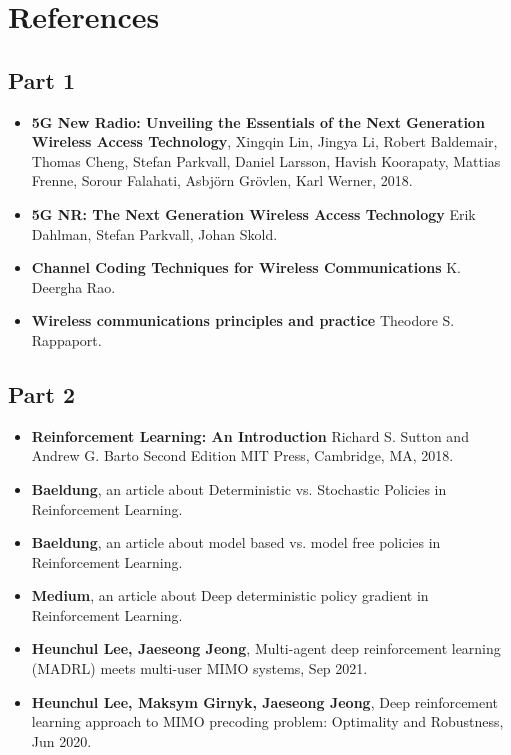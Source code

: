 \chapter{References}

\section{Part 1}
    \begin{itemize}
        \item \textbf{5G New Radio: Unveiling the Essentials of the Next Generation Wireless Access Technology}, Xingqin Lin, Jingya Li, Robert Baldemair, Thomas Cheng, Stefan Parkvall, Daniel Larsson, Havish Koorapaty, Mattias Frenne, Sorour Falahati, Asbjörn Grövlen, Karl Werner, 2018.
        \item \textbf{5G NR: The Next Generation Wireless Access Technology} Erik Dahlman, Stefan Parkvall, Johan Skold.
        \item \textbf{Channel Coding Techniques for Wireless Communications} K. Deergha Rao.
        \item \textbf{Wireless communications principles and practice} Theodore S. Rappaport.
    \end{itemize}

\section{Part 2}
\begin{itemize}
    \item \textbf{Reinforcement Learning: An Introduction} Richard S. Sutton and Andrew G. Barto Second Edition MIT Press, Cambridge, MA, 2018.
    \item \textbf{Baeldung}, an article about Deterministic vs. Stochastic Policies in Reinforcement Learning.
    \item \textbf{Baeldung}, an article about model based vs. model free policies in Reinforcement Learning.
    \item \textbf{Medium}, an article about Deep deterministic policy gradient in Reinforcement Learning.
    \item \textbf{Heunchul Lee, Jaeseong Jeong}, Multi-agent deep reinforcement learning (MADRL) meets multi-user MIMO systems, Sep 2021.
    \item \textbf{Heunchul Lee, Maksym Girnyk, Jaeseong Jeong}, Deep reinforcement learning approach to MIMO precoding problem: Optimality and Robustness, Jun 2020.
\end{itemize}

